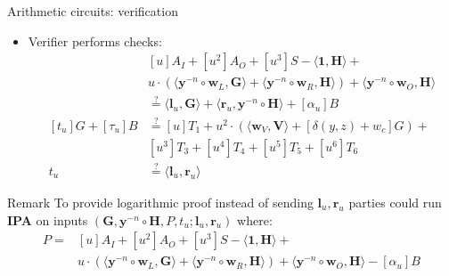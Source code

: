 \documentclass{zkdl-presentation-template}
\begin{document}
\begin{frame}{Arithmetic circuits: verification}
    \begin{itemize}
        \item Verifier performs checks:
            \begin{equation*}
                \begin{aligned}
                    &[u]A_I + [u^2]A_O + [u^3]S - \langle \mathbf{1}, \mathbf{H} \rangle + \\
                    &u \cdot (\langle \mathbf{y}^{-n} \circ \mathbf{w}_L, \mathbf{G} \rangle + \langle \mathbf{y}^{-n} \circ \mathbf{w}_R, \mathbf{H} \rangle) + \langle \mathbf{y}^{-n} \circ \mathbf{w}_O, \mathbf{H} \rangle \\
                    &\stackrel{\text{?}}{=} \langle \mathbf{l}_u, \mathbf{G} \rangle + \langle \mathbf{r}_u, \mathbf{y}^{-n} \circ \mathbf{H} \rangle + [\alpha_u]B\\
                    [t_u]G + [\tau_u]B &\stackrel{\text{?}}{=} [u]T_1 + u^2 \cdot (\langle \mathbf{w}_V, \mathbf{V} \rangle + [\delta(y,z) + w_c]G) +\\
                    &[u^3]T_3 + [u^4]T_4 + [u^5]T_5 + [u^6]T_6\\
                    t_u &\stackrel{\text{?}}{=} \langle \mathbf{l}_u, \mathbf{r}_u \rangle
                \end{aligned}
            \end{equation*}
    \end{itemize}
    \begin{block}{Remark}
        To provide logarithmic proof instead of sending $\mathbf{l}_u, \mathbf{r}_u$ parties could run \textbf{IPA} on inputs $(\mathbf{G},\mathbf{y}^{-n} \circ \mathbf{H}, P, t_u; \mathbf{l}_u, \mathbf{r}_u)$ where:
        \begin{align*}
            P =& [u]A_I + [u^2]A_O + [u^3]S - \langle \mathbf{1}, \mathbf{H} \rangle +\\
                &u \cdot (\langle \mathbf{y}^{-n} \circ \mathbf{w}_L, \mathbf{G} \rangle + \langle \mathbf{y}^{-n} \circ \mathbf{w}_R, \mathbf{H} \rangle) + \langle \mathbf{y}^{-n} \circ \mathbf{w}_O, \mathbf{H} \rangle - [\alpha_u]B
        \end{align*}
    \end{block}
\end{frame}
\end{document}
